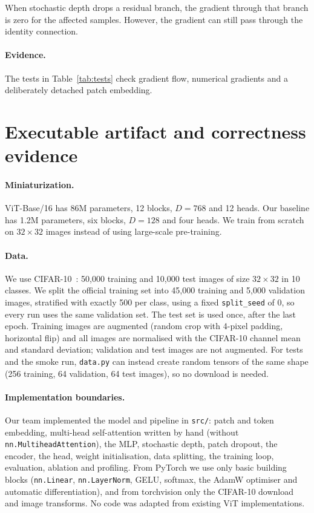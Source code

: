\documentclass{article}
\begin{document}
When stochastic depth drops a residual branch, the
gradient through that branch is zero for the affected
samples. However, the gradient can still pass through
the identity connection.

\paragraph{Evidence.}
The tests in Table~\ref{tab:tests} check gradient flow, numerical gradients and a deliberately detached patch embedding.

\section{Executable artifact and correctness evidence}

\label{sec:artifact}
\paragraph{Miniaturization.}
ViT-Base/16 has 86M parameters, 12 blocks, $D=768$ and 12 heads. Our baseline has 1.2M parameters, six blocks, $D=128$ and four heads. We train from scratch on $32\times32$ images instead of using large-scale pre-training.

\paragraph{Data.}
We use CIFAR-10~\citep{krizhevsky2009learning}: 50{,}000 training and
10{,}000 test images of size $32\times32$ in 10 classes. We split the
official training set into 45{,}000 training and 5{,}000 validation images,
stratified with exactly 500 per class, using a fixed \texttt{split\_seed}
of 0, so every run uses the same validation set. The test set is used once,
after the last epoch. Training images are augmented (random crop with
4-pixel padding, horizontal flip) and all images are normalised with the
CIFAR-10 channel mean and standard deviation; validation and test images
are not augmented. For tests and the smoke run, \texttt{data.py} can
instead create random tensors of the same shape (256 training, 64
validation, 64 test images), so no download is needed.

\paragraph{Implementation boundaries.}
Our team implemented the model and pipeline in \texttt{src/}: patch and
token embedding, multi-head self-attention written by hand (without
\texttt{nn.MultiheadAttention}), the MLP, stochastic depth, patch dropout,
the encoder, the head, weight initialisation, data splitting, the training
loop, evaluation, ablation and profiling. From PyTorch we use only basic
building blocks (\texttt{nn.Linear}, \texttt{nn.LayerNorm}, GELU, softmax,
the AdamW optimiser and automatic differentiation), and from torchvision
only the CIFAR-10 download and image transforms. No code was adapted from
existing ViT implementations.
\end{document}
